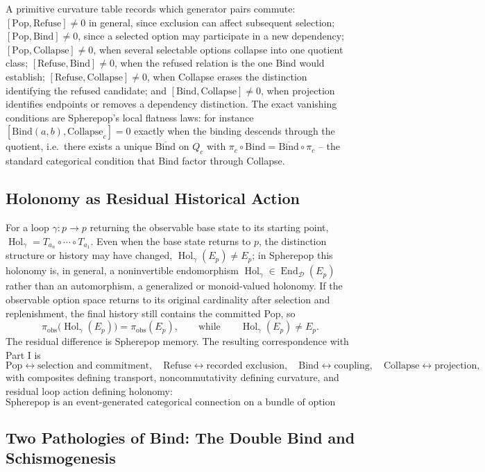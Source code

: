 \documentclass[11pt]{article}
\newcommand{\Hol}{\operatorname{Hol}}
\newcommand{\Pop}{\mathrm{Pop}}
\newcommand{\Refuse}{\mathrm{Refuse}}
\newcommand{\Bind}{\mathrm{Bind}}
\newcommand{\Collapse}{\mathrm{Collapse}}
\begin{document}
A primitive curvature table records which generator pairs commute: $[\Pop, \Refuse] \neq 0$ in general, since exclusion can affect subsequent selection; $[\Pop, \Bind] \neq 0$, since a selected option may participate in a new dependency; $[\Pop, \Collapse] \neq 0$, when several selectable options collapse into one quotient class; $[\Refuse, \Bind] \neq 0$, when the refused relation is the one Bind would establish; $[\Refuse, \Collapse] \neq 0$, when Collapse erases the distinction identifying the refused candidate; and $[\Bind, \Collapse] \neq 0$, when projection identifies endpoints or removes a dependency distinction. The exact vanishing conditions are Spherepop's local flatness laws: for instance $[\Bind(a,b), \Collapse_c] = 0$ exactly when the binding descends through the quotient, i.e.\ there exists a unique $\overline{\Bind}$ on $Q_c$ with $\pi_c \circ \Bind = \overline{\Bind} \circ \pi_c$ -- the standard categorical condition that Bind factor through Collapse.

\subsection{Holonomy as Residual Historical Action}

For a loop $\gamma : p \to p$ returning the observable base state to its starting point, $\Hol_\gamma = T_{a_n} \circ \cdots \circ T_{a_1}$. Even when the base state returns to $p$, the distinction structure or history may have changed, $\Hol_\gamma(E_p) \neq E_p$; in Spherepop this holonomy is, in general, a noninvertible endomorphism $\Hol_\gamma \in \operatorname{End}_{\mathcal{D}}(E_p)$ rather than an automorphism, a generalized or monoid-valued holonomy. If the observable option space returns to its original cardinality after selection and replenishment, the final history still contains the committed Pop, so
\[
\pi_{\mathrm{obs}}\bigl(\Hol_\gamma(E_p)\bigr) = \pi_{\mathrm{obs}}(E_p), \qquad \text{while} \qquad \Hol_\gamma(E_p) \neq E_p.
\]
The residual difference is Spherepop memory. The resulting correspondence with Part I is
\[
\Pop \leftrightarrow \text{selection and commitment}, \quad \Refuse \leftrightarrow \text{recorded exclusion}, \quad \Bind \leftrightarrow \text{coupling}, \quad \Collapse \leftrightarrow \text{projection},
\]
with composites defining transport, noncommutativity defining curvature, and residual loop action defining holonomy:
\[
\text{Spherepop is an event-generated categorical connection on a bundle of option spaces.}
\]

\subsection{Two Pathologies of Bind: The Double Bind and Schismogenesis}
\end{document}
